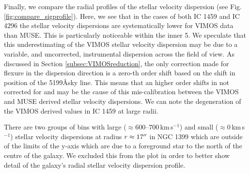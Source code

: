 			Finally, we compare the radial profiles of the stellar velocity dispersion (see Fig.\,\ref{fig:compare_sigprofile}). Here, we see that in the cases of both IC 1459 and IC 4296 the stellar velocity dispersions are systematically lower for VIMOS data than MUSE. This is particularly noticeable within the inner 5\arcsec. 
			We speculate that this underestimating of the VIMOS stellar velocity dispersion may be due to a variable, and uncorrected, instrumental dispersion across the field of view. As discussed in Section \ref{subsec:VIMOSreduction}, the only correction made for flexure in the dispersion direction is a zero-th order shift based on the shift in position of the 5199\AA sky line. This means that an higher order shifts in not corrected for and may be the cause of this mis-calibration between the VIMOS and MUSE derived stellar velocity dispersions. We can note the degeneration of the VIMOS derived values in IC 1459 at large radii. 




			There are two groups of bins with large ($\approx$600--700\,km\,s$^{-1}$) and small ($\approx 0$\,km\,s$^{-1}$) stellar velocity dispersions at radius $r \approx 17\hbox{$^{\prime\prime}$}$ in NGC 1399 which are outside of the limits of the y-axis which are due to a foreground star to the north of the centre of the galaxy. We excluded this from the plot in order to better show detail of the galaxy's radial stellar velocity dispersion profile.


